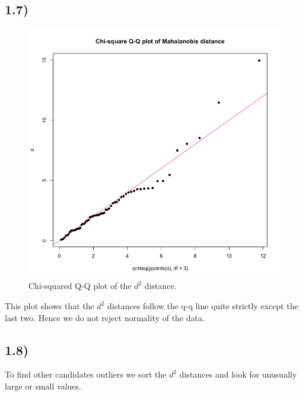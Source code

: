 \documentclass[a4paper,11pt,oneside]{report}
\begin{document}
\subsection*{1.7)}
	\begin{figure}[H]
	\centering
	\includegraphics[scale = 0.35]{Mahala_q_q_chi.png}
	\caption{Chi-squared Q-Q plot of the $d^2$ distance.}
	\end{figure}
	This plot shows that the $d^2$ distances follow the q-q line quite strictly except the last two. Hence we do not reject normality of the data.
	
\subsection*{1.8)}
	To find other candidates outliers we sort the $d^2$ distances and look for unusually large or small values.
	
\end{document}
